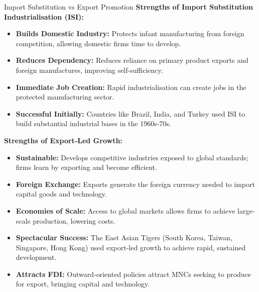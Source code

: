 \documentclass[11pt, a4paper, twoside]{book}
\begin{document}
\begin{evaluation}{Import Substitution vs Export Promotion}
\textbf{Strengths of Import Substitution Industrialisation (ISI):}
\begin{itemize}
  \item \textbf{Builds Domestic Industry:} Protects infant manufacturing from foreign competition, allowing domestic firms time to develop.
  \item \textbf{Reduces Dependency:} Reduces reliance on primary product exports and foreign manufactures, improving self-sufficiency.
  \item \textbf{Immediate Job Creation:} Rapid industrialisation can create jobs in the protected manufacturing sector.
  \item \textbf{Successful Initially:} Countries like Brazil, India, and Turkey used ISI to build substantial industrial bases in the 1960s-70s.
\end{itemize}

\textbf{Strengths of Export-Led Growth:}
\begin{itemize}
  \item \textbf{Sustainable:} Develops competitive industries exposed to global standards; firms learn by exporting and become efficient.
  \item \textbf{Foreign Exchange:} Exports generate the foreign currency needed to import capital goods and technology.
  \item \textbf{Economies of Scale:} Access to global markets allows firms to achieve large-scale production, lowering costs.
  \item \textbf{Spectacular Success:} The East Asian Tigers (South Korea, Taiwan, Singapore, Hong Kong) used export-led growth to achieve rapid, sustained development.
  \item \textbf{Attracts FDI:} Outward-oriented policies attract MNCs seeking to produce for export, bringing capital and technology.
\end{itemize}


\end{evaluation}
\end{document}
